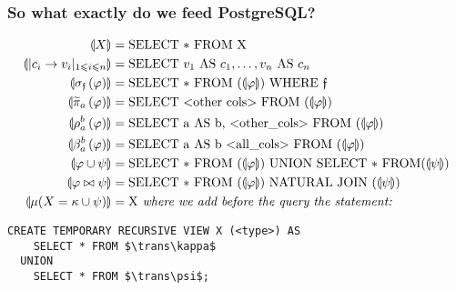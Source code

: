 \documentclass{beamer}
\newcommand{\filt}[2][\mathfrak f]{{\sigma_{#1}\left(#2\right)}}
\newcommand{\rename}[3]{\rho_{#1}^{#2}\left(#3\right)}
\newcommand{\drop}[2]{\widetilde{\pi}_{#1}\left(#2\right)}
\newcommand{\mult}[3]{\beta_{#1}^{#2}\left(#3\right)}
\newcommand{\NJoin}{\bowtie}
\newcommand{\fixpt}[2][X]{\mu {\left(#1=#2\right)}}
\newcommand*\trans[1]{\llparenthesis{#1}\rrparenthesis}
\begin{document}
\begin{frame}[fragile]
  \frametitle{So what exactly do we feed PostgreSQL?}
  \begin{align*}
    \trans{X} &= \text{\lstinline{SELECT * FROM X}}\\
    \trans{|c_i\to v_i|_{1\leqslant i\leqslant n}} &=
      \text{\lstinline{SELECT} } v_1 \text{ \lstinline{AS} }
       c_1,\ldots, v_n \text{ \lstinline{AS} } c_n\\
    \trans{\filt{\varphi}} &= \text{\lstinline{SELECT * FROM}
                             }(\trans{\varphi}) \text{
                             \lstinline{WHERE} } \mathfrak{f}\\
    \trans{\drop a \varphi} &= \text{\lstinline{SELECT <other cols>
                              FROM} }(\trans\varphi)\\    
    \trans{\rename a b \varphi} &= \text{\lstinline{SELECT a AS b,
                                  <other_cols> FROM}
                                  }(\trans\varphi)\\
    \trans{\mult a b \varphi} &= \text{\lstinline{SELECT a AS b
                                  <all_cols> FROM}
                               }(\trans\varphi)\\
    \trans{\varphi\cup\psi} &= \text{\lstinline{SELECT * FROM}
                              }(\trans{\varphi}) \text{
                              \lstinline!UNION SELECT * FROM !} (\trans{\psi})\\
    \trans{\varphi\NJoin\psi} &= \text{\lstinline{SELECT * FROM} }(\trans{\varphi}) \text{ \lstinline|NATURAL
                                JOIN| } (\trans{\psi})\\
    \trans{\fixpt{\kappa\cup\psi}} &= \text{\lstinline!X !}
                                     \textit{ where we add
                                     before the query the statement:}
  \end{align*}
\small
  \begin{lstlisting}[mathescape]
CREATE TEMPORARY RECURSIVE VIEW X (<type>) AS
    SELECT * FROM $\trans\kappa$
  UNION
    SELECT * FROM $\trans\psi$;    
\end{lstlisting}
\vfill\null
\end{frame}
\end{document}
